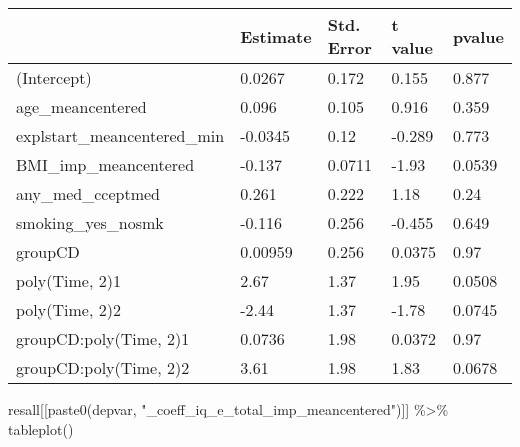 \documentclass[
]{article}
\newenvironment{Shaded}{\begin{snugshade}}{\end{snugshade}}
\newcommand{\FunctionTok}[1]{\textcolor[rgb]{0.00,0.00,0.00}{#1}}
\newcommand{\NormalTok}[1]{#1}
\newcommand{\SpecialCharTok}[1]{\textcolor[rgb]{0.00,0.00,0.00}{#1}}
\newcommand{\StringTok}[1]{\textcolor[rgb]{0.31,0.60,0.02}{#1}}
\begin{document}
\begin{table}
\centering
\begin{tabular}[t]{l|l|l|l|l}
\hline
  & Estimate & Std. Error & t value & pvalue\\
\hline
(Intercept) & 0.0267 & 0.172 & 0.155 & 0.877\\
\hline
age\_meancentered & 0.096 & 0.105 & 0.916 & 0.359\\
\hline
explstart\_meancentered\_min & -0.0345 & 0.12 & -0.289 & 0.773\\
\hline
BMI\_imp\_meancentered & -0.137 & 0.0711 & -1.93 & 0.0539\\
\hline
any\_med\_cceptmed & 0.261 & 0.222 & 1.18 & 0.24\\
\hline
smoking\_yes\_nosmk & -0.116 & 0.256 & -0.455 & 0.649\\
\hline
groupCD & 0.00959 & 0.256 & 0.0375 & 0.97\\
\hline
poly(Time, 2)1 & 2.67 & 1.37 & 1.95 & 0.0508\\
\hline
poly(Time, 2)2 & -2.44 & 1.37 & -1.78 & 0.0745\\
\hline
groupCD:poly(Time, 2)1 & 0.0736 & 1.98 & 0.0372 & 0.97\\
\hline
groupCD:poly(Time, 2)2 & 3.61 & 1.98 & 1.83 & 0.0678\\
\hline
\end{tabular}
\end{table}

\begin{Shaded}
\begin{Highlighting}[]
\NormalTok{resall[[}\FunctionTok{paste0}\NormalTok{(depvar, }\StringTok{"\_coeff\_iq\_e\_total\_imp\_meancentered"}\NormalTok{)]] }\SpecialCharTok{\%\textgreater{}\%} \FunctionTok{tableplot}\NormalTok{()}
\end{Highlighting}
\end{Shaded}
\end{document}
